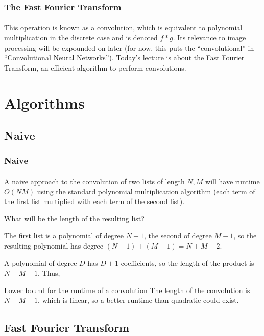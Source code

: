 \documentclass[11pt,handout]{beamer}             %
\begin{document}
\begin{frame}
\frametitle{The Fast Fourier Transform}
\framesubtitle{}
This operation is known as a \alert{convolution}, which is equivalent to
polynomial multiplication in the discrete case and is denoted \( f * g \).
Its relevance to image processing will be expounded on later
(for now, this puts the \enquote{convolutional}
in \enquote{Convolutional Neural Networks}).
Today's lecture is about the \alert{Fast Fourier Transform}, an efficient
algorithm to perform convolutions.
\end{frame}

\section{Algorithms}
\subsection{Naive}
\begin{frame}
\frametitle{Naive}
\framesubtitle{}
A naive approach to the convolution of two lists of length \( N, M \) will have
runtime \( O(NM) \) using the standard polynomial multiplication algorithm (each
term of the first list multiplied with each term of the second list). \pause

What will be the length of the resulting list? \pause

The first list is a polynomial of degree \( N - 1 \),
the second of degree \( M - 1 \), so the resulting polynomial has degree 
\( (N - 1) + (M - 1) = N + M - 2 \). \pause 

A polynomial of degree \( D \) has \( D + 1 \) coefficients, 
so the length of the product is \( N + M - 1 \). Thus, \pause
\begin{block}{Lower bound for the runtime of a convolution}
  The length of the convolution is \( N + M - 1 \), which is linear,
  so a better runtime than quadratic could exist. 
\end{block}
\end{frame}

\subsection[FTT]{Fast Fourier Transform}
\end{document}
